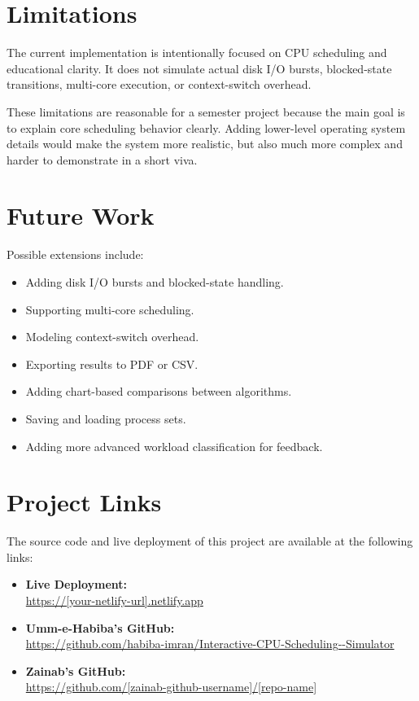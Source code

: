 \documentclass[12pt]{article}
\begin{document}
\section{Limitations}
The current implementation is intentionally focused on CPU scheduling and educational clarity. It does not simulate actual disk I/O bursts, blocked-state transitions, multi-core execution, or context-switch overhead.

These limitations are reasonable for a semester project because the main goal is to explain core scheduling behavior clearly. Adding lower-level operating system details would make the system more realistic, but also much more complex and harder to demonstrate in a short viva.

\section{Future Work}
Possible extensions include:
\begin{itemize}[leftmargin=*]
    \item Adding disk I/O bursts and blocked-state handling.
    \item Supporting multi-core scheduling.
    \item Modeling context-switch overhead.
    \item Exporting results to PDF or CSV.
    \item Adding chart-based comparisons between algorithms.
    \item Saving and loading process sets.
    \item Adding more advanced workload classification for feedback.
\end{itemize}

\section{Project Links}
The source code and live deployment of this project are available at the following links:
\begin{itemize}[leftmargin=*]
    \item \textbf{Live Deployment:} \\
    \url{https://[your-netlify-url].netlify.app}
    \item \textbf{Umm-e-Habiba's GitHub:} \\
    \url{https://github.com/habiba-imran/Interactive-CPU-Scheduling--Simulator}
    \item \textbf{Zainab's GitHub:} \\
    \url{https://github.com/[zainab-github-username]/[repo-name]}
\end{itemize}
\end{document}
